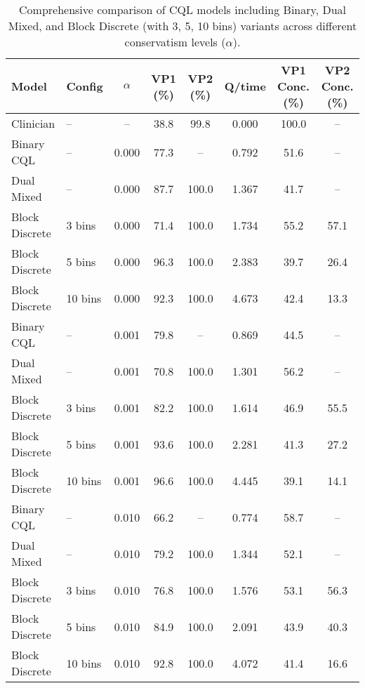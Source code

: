 \begin{table}[ht]
\centering
\caption{Comprehensive comparison of CQL models including Binary, Dual Mixed, and Block Discrete (with 3, 5, 10 bins) variants across different conservatism levels ($\alpha$).}
\label{tab:cql_comparison}
\begin{tabular}{llcccccc}
\toprule
Model & Config & $\alpha$ & VP1 (\%) & VP2 (\%) & Q/time & VP1 Conc. (\%) & VP2 Conc. (\%) \\
\midrule
Clinician & -- & -- & 38.8 & 99.8 & 0.000 & 100.0 & -- \\
\midrule
Binary CQL & -- & 0.000 & 77.3 & -- & 0.792 & 51.6 & -- \\
Dual Mixed & -- & 0.000 & 87.7 & 100.0 & 1.367 & 41.7 & -- \\
Block Discrete & 3 bins & 0.000 & 71.4 & 100.0 & 1.734 & 55.2 & 57.1 \\
Block Discrete & 5 bins & 0.000 & 96.3 & 100.0 & 2.383 & 39.7 & 26.4 \\
Block Discrete & 10 bins & 0.000 & 92.3 & 100.0 & 4.673 & 42.4 & 13.3 \\
\midrule
Binary CQL & -- & 0.001 & 79.8 & -- & 0.869 & 44.5 & -- \\
Dual Mixed & -- & 0.001 & 70.8 & 100.0 & 1.301 & 56.2 & -- \\
Block Discrete & 3 bins & 0.001 & 82.2 & 100.0 & 1.614 & 46.9 & 55.5 \\
Block Discrete & 5 bins & 0.001 & 93.6 & 100.0 & 2.281 & 41.3 & 27.2 \\
Block Discrete & 10 bins & 0.001 & 96.6 & 100.0 & 4.445 & 39.1 & 14.1 \\
\midrule
Binary CQL & -- & 0.010 & 66.2 & -- & 0.774 & 58.7 & -- \\
Dual Mixed & -- & 0.010 & 79.2 & 100.0 & 1.344 & 52.1 & -- \\
Block Discrete & 3 bins & 0.010 & 76.8 & 100.0 & 1.576 & 53.1 & 56.3 \\
Block Discrete & 5 bins & 0.010 & 84.9 & 100.0 & 2.091 & 43.9 & 40.3 \\
Block Discrete & 10 bins & 0.010 & 92.8 & 100.0 & 4.072 & 41.4 & 16.6 \\
\bottomrule
\end{tabular}
\end{table}